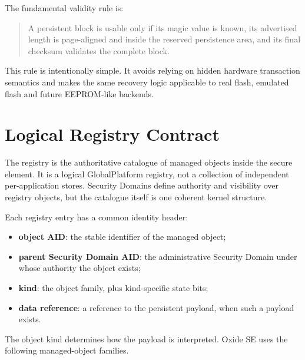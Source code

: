 The fundamental validity rule is:

\begin{quote}
A persistent block is usable only if its magic value is known, its advertised
length is page-aligned and inside the reserved persistence area, and its final
checksum validates the complete block.
\end{quote}

This rule is intentionally simple. It avoids relying on hidden hardware
transaction semantics and makes the same recovery logic applicable to real
flash, emulated flash and future EEPROM-like backends.

\section{Logical Registry Contract}
\label{sec:registry-logical-contract}

The registry is the authoritative catalogue of managed objects inside the
secure element. It is a logical GlobalPlatform registry, not a collection of
independent per-application stores. Security Domains define authority and
visibility over registry objects, but the catalogue itself is one coherent
kernel structure.

Each registry entry has a common identity header:

\begin{itemize}
\item \textbf{object AID}: the stable identifier of the managed object;
\item \textbf{parent Security Domain AID}: the administrative Security
  Domain under whose authority the object exists;
\item \textbf{kind}: the object family, plus kind-specific state bits;
\item \textbf{data reference}: a reference to the persistent payload, when
  such a payload exists.
\end{itemize}

The object kind determines how the payload is interpreted. Oxide SE uses
the following managed-object families.

